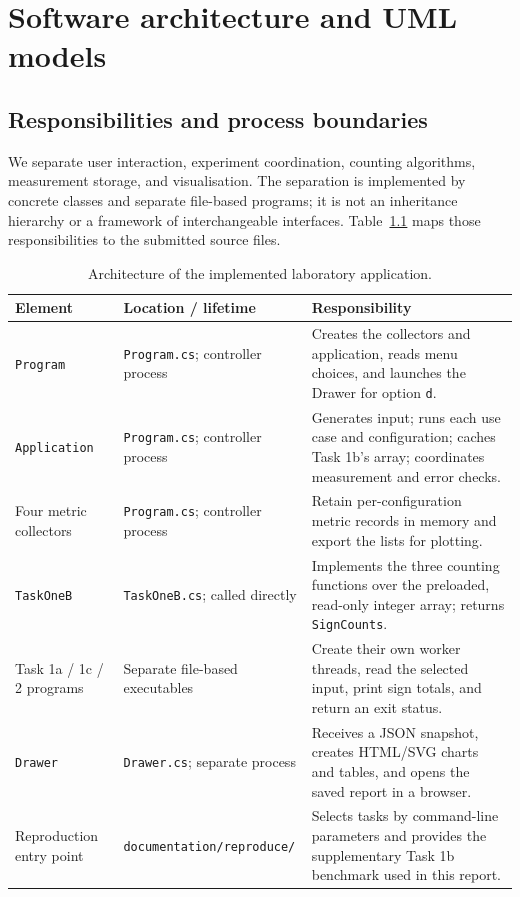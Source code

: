 \chapter{Software architecture and UML models}
\section{Responsibilities and process boundaries}
We separate user interaction, experiment coordination, counting algorithms, measurement storage, and visualisation. The separation is implemented by concrete classes and separate file-based programs; it is not an inheritance hierarchy or a framework of interchangeable interfaces. Table~\ref{tab:architecture} maps those responsibilities to the submitted source files.

\begin{table}[H]\centering\small
\caption{Architecture of the implemented laboratory application.}\label{tab:architecture}
\begin{tabularx}{\textwidth}{@{}p{}p{}X@{}}\toprule
Element & Location / lifetime & Responsibility\\\midrule
\texttt{Program} & \texttt{Program.cs}; controller process & Creates the collectors and application, reads menu choices, and launches the Drawer for option \texttt{d}.\\
\texttt{Application} & \texttt{Program.cs}; controller process & Generates input; runs each use case and configuration; caches Task 1b's array; coordinates measurement and error checks.\\
Four metric collectors & \texttt{Program.cs}; controller process & Retain per-configuration metric records in memory and export the lists for plotting.\\
\texttt{TaskOneB} & \texttt{TaskOneB.cs}; called directly & Implements the three counting functions over the preloaded, read-only integer array; returns \texttt{SignCounts}.\\
Task 1a / 1c / 2 programs & Separate file-based executables & Create their own worker threads, read the selected input, print sign totals, and return an exit status.\\
\texttt{Drawer} & \texttt{Drawer.cs}; separate process & Receives a JSON snapshot, creates HTML/SVG charts and tables, and opens the saved report in a browser.\\
Reproduction entry point & \texttt{documentation/}\newline\texttt{reproduce/} & Selects tasks by command-line parameters and provides the supplementary Task 1b benchmark used in this report.\\\bottomrule
\end{tabularx}
\end{table}


